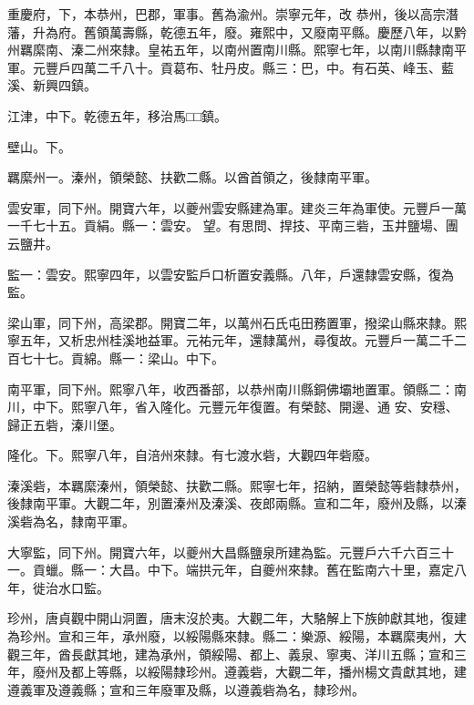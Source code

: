 \begin{pinyinscope}
 重慶府，下，本恭州，巴郡，軍事。舊為渝州。崇寧元年，改
 恭州，後以高宗潛藩，升為府。舊領萬壽縣，乾德五年，廢。雍熙中，又廢南平縣。慶歷八年，以黔州羈縻南、溱二州來隸。皇祐五年，以南州置南川縣。熙寧七年，以南川縣隸南平軍。元豐戶四萬二千八十。貢葛布、牡丹皮。縣三：巴，中。有石英、峰玉、藍溪、新興四鎮。



 江津，中下。乾德五年，移治馬□□鎮。



 壁山。下。



 羈縻州一。溱州，領榮懿、扶歡二縣。以酋首領之，後隸南平軍。



 雲安軍，同下州。開寶六年，以夔州雲安縣建為軍。建炎三年為軍使。元豐戶一萬一千七十五。貢絹。縣一：雲安。
 望。有思問、捍技、平南三砦，玉井鹽場、團云鹽井。



 監一：雲安。熙寧四年，以雲安監戶口析置安義縣。八年，戶還隸雲安縣，復為監。



 梁山軍，同下州，高梁郡。開寶二年，以萬州石氏屯田務置軍，撥梁山縣來隸。熙寧五年，又析忠州桂溪地益軍。元祐元年，還隸萬州，尋復故。元豐戶一萬二千二百七十七。貢綿。縣一：梁山。中下。



 南平軍，同下州。熙寧八年，收西番部，以恭州南川縣銅佛壩地置軍。領縣二：南川，中下。熙寧八年，省入隆化。元豐元年復置。有榮懿、開邊、通
 安、安穩、歸正五砦，溱川堡。



 隆化。下。熙寧八年，自涪州來隸。有七渡水砦，大觀四年砦廢。



 溱溪砦，本羈縻溱州，領榮懿、扶歡二縣。熙寧七年，招納，置榮懿等砦隸恭州，後隸南平軍。大觀二年，別置溱州及溱溪、夜郎兩縣。宣和二年，廢州及縣，以溱溪砦為名，隸南平軍。



 大寧監，同下州。開寶六年，以夔州大昌縣鹽泉所建為監。元豐戶六千六百三十一。貢蠟。縣一：大昌。中下。端拱元年，自夔州來隸。舊在監南六十里，嘉定八年，徙治水口監。



 珍州，唐貞觀中開山洞置，唐末沒於夷。大觀二年，大駱解上下族帥獻其地，復建為珍州。宣和三年，承州廢，以綏陽縣來隸。縣二：樂源、綏陽，本羈縻夷州，大觀三年，酋長獻其地，建為承州，領綏陽、都上、義泉、寧夷、洋川五縣；宣和三年，廢州及都上等縣，以綏陽隸珍州。遵義砦，大觀二年，播州楊文貴獻其地，建遵義軍及遵義縣；宣和三年廢軍及縣，以遵義砦為名，隸珍州。




\end{pinyinscope}
